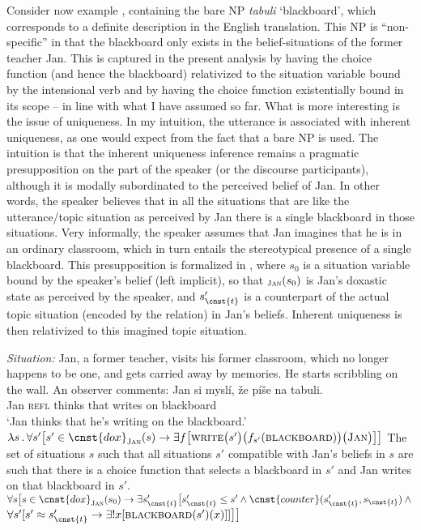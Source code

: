 \documentclass[output=paper,colorlinks,citecolor=brown,newtxmath]{langscibook}
\begin{document}
\noindent Consider now example , containing the bare NP \textit{tabuli} `blackboard', which corresponds to a definite description in the English translation. This NP is ``non-specific'' in that the blackboard only exists in the belief-situations of the former teacher Jan. This is captured in the present analysis by having the choice function (and hence the blackboard) relativized to the situation variable bound by the intensional verb and by having the choice function existentially bound in its scope -- in line with what I have assumed so far. What is more interesting is the issue of uniqueness. In my intuition, the utterance is associated with inherent uniqueness, as one would expect from the fact that a bare NP is used. The intuition is that the inherent uniqueness inference remains a pragmatic presupposition on the part of the speaker (or the discourse participants), although it is modally subordinated to the perceived belief of Jan. In other words, the speaker believes that in all the situations that are like the utterance/topic situation as perceived by Jan there is a single blackboard in those situations. Very informally, the speaker assumes that Jan imagines that he is in an ordinary classroom, which in turn entails the stereotypical presence of a single blackboard. This presupposition is formalized in , where $s_0$ is a situation variable bound by the speaker's belief (left implicit), so that $_{\textsc{Jan}}(s_0)$ is Jan's doxastic state as perceived by the speaker, and $s'_{\cnst{t}}$ is a counterpart of the actual topic situation (encoded by the  relation) in Jan's beliefs. Inherent uniqueness is then relativized to this imagined topic situation.

\eanoraggedright \textit{Situation:} Jan, a former teacher, visits his former classroom, which no longer happens to be one, and gets carried away by memories. He starts scribbling on the wall. An observer comments:\label{simik:ex:false-bel}
\ea\gll Jan si myslí, že píše na tabuli.\\
Jan \textsc{refl} thinks that writes on blackboard\\
\glt `Jan thinks that he's writing on the blackboard.'
\ex $\lambda s\,.\,\forall s'\big[s'\in\cnst{dox}_{\textsc{Jan}}(s)\rightarrow \exists f\big[\textsc{write}\big(s'\big)\big( f_{s'}(\textsc{blackboard})\big)\big(\textsc{Jan}\big)\big]\big]$
\ex The set of situations $s$ such that all situations $s'$ compatible with Jan's beliefs in $s$ are such that there is a choice function that selects a blackboard in $s'$ and Jan writes on that blackboard in $s'$.
\ex  $\forall s\big[s\in\cnst{dox}_{\textsc{Jan}}(s_0)\rightarrow\exists s'_{\cnst{t}}\big[s'_{\cnst{t}}\leq s'\wedge \cnst{counter}(s'_{\cnst{t}},s_{\cnst{t}})\wedge{}$\\
\tabto{1cm}$\forall s'[s'\approx s'_{\cnst{t}}\rightarrow\exists! x[\textsc{blackboard}(s')(x)]]\big]\big]$\label{simik:ex:mod-sub-pres}
\z\z
\end{document}
